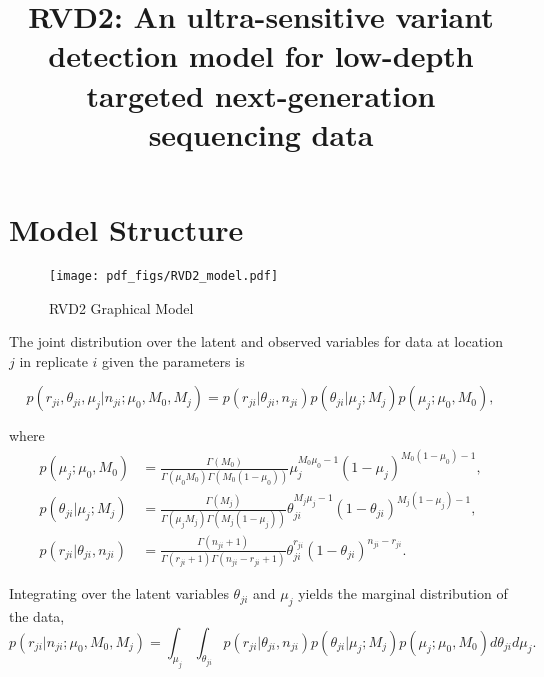 \documentclass[11pt,reqno]{amsart}
\title[RVD2]{RVD2: An ultra-sensitive variant detection model for low-depth targeted next-generation sequencing data}
\author{}
\begin{document}
\maketitle


\section{Model Structure}\label{sec:model_structure}




\begin{figure}[h]
\begin{center}
\texttt{[image: pdf\_figs/RVD2\_model.pdf]}
\caption{RVD2 Graphical Model}
\label{fig:graphical_model}
\end{center}
\end{figure}


The joint distribution over the latent and observed variables for data at location $j$ in replicate $i$ given the parameters is

\begin{equation}\label{eqn:jointpdf}
p \left( r_{ji}, \theta_{ji}, \mu_j | n_{ji}; \mu_0, M_0, M_j \right) = p \left( r_{ji} | \theta_{ji}, n_{ji} \right) p\left( \theta_{ji} | \mu_j; M_j \right) p\left( \mu_j; \mu_0, M_0 \right),
\end{equation}

where
\begin{align}
p\left( \mu_j; \mu_0, M_0 \right)  &= \frac{ \Gamma(M_0) } { \Gamma(\mu_0 M_0) \Gamma(M_0 (1-\mu_0)) } \mu_j^{M_0\mu_0 -1} (1 - \mu_j)^{M_0 ( 1 - \mu_0) - 1}, \nonumber \\
p\left( \theta_{ji} | \mu_j; M_j \right) &= \frac{ \Gamma(M_j) } { \Gamma(\mu_j M_j) \Gamma(M_j (1-\mu_j)) } \theta_{ji}^{M_j\mu_j -1} (1 - \theta_{ji})^{M_j ( 1 - \mu_j) - 1}, \nonumber \\
p \left( r_{ji} | \theta_{ji}, n_{ji} \right) &= \frac{ \Gamma(n_{ji}+1) } { \Gamma(r_{ji}+1) \Gamma( n_{ji} - r_{ji} + 1 ) } \theta_{ji}^{r_{ji}} (1 - \theta_{ji})^{n_{ji} - r_{ji}}. \nonumber
\end{align}

Integrating over the latent variables $\theta_{ji}$ and $\mu_j$ yields the marginal distribution of the data,
\begin{equation}
p \left( r_{ji} | n_{ji} ; \mu_0, M_0, M_j \right) = \int_{\mu_j} \int_{\theta_{ji}}  p \left( r_{ji} | \theta_{ji}, n_{ji} \right) p\left( \theta_{ji} | \mu_j; M_j \right) p\left( \mu_j; \mu_0, M_0 \right) d\theta_{ji} d\mu_j.
\end{equation}
\end{document}
